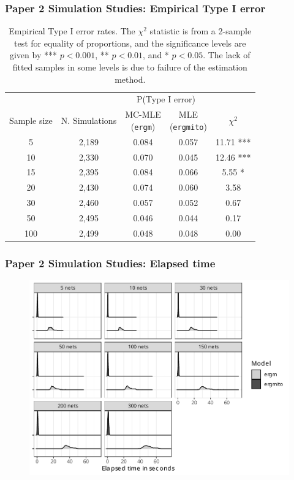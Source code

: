 \documentclass[aspectratio=169, 9pt]{beamer}\usepackage[]{graphicx}\usepackage[]{color}
\newcommand{\ergmpkg}[0]{\texttt{ergm}}
\newcommand{\ergmitopkg}[0]{\texttt{ergmito}}
\begin{document}
\begin{frame}
\frametitle{Paper 2 Simulation Studies: Empirical Type I error}

\footnotesize

\begin{table}[ht]
	\centering
	\begin{tabular}{ccccc}
		\toprule & & \multicolumn{2}{c}{P(Type I error)} \\ \cmidrule(r){3-4}
		Sample size & N. Simulations & \makecell{MC-MLE \\ (\ergmpkg{})} & \makecell{MLE \\ (\ergmitopkg{})} & $\chi^2$ \\ 
		\midrule
		5 & 2,189 & 0.084 & 0.057 & 11.71 *** \\ 
		10 & 2,330 & 0.070 & 0.045 & 12.46 *** \\ 
		15 & 2,395 & 0.084 & 0.066 & 5.55 * \\ 
		20 & 2,430 & 0.074 & 0.060 & 3.58  \\ 
		30 & 2,460 & 0.057 & 0.052 & 0.67  \\ 
		50 & 2,495 & 0.046 & 0.044 & 0.17  \\ 
		100 & 2,499 & 0.048 & 0.048 & 0.00  \\ 
		\bottomrule
	\end{tabular}
	\caption{\label{tab:typeI}Empirical Type I error rates. The $\chi^2$ statistic is from a 2-sample test for equality of proportions, and the significance levels are given by *** $p < 0.001$, ** $p < 0.01$, and * $p < 0.05$. The lack of fitted samples in some levels is due to failure of the estimation method.} 
\end{table}

\end{frame}

\begin{frame}[label=ergmitoexperiment]
\frametitle{Paper 2 Simulation Studies: Elapsed time}

\begin{figure}
\centering
\includegraphics[width=.6\linewidth]{bias-elapsed-02-various-sizes-4-5-ttriad.pdf}
\end{figure}

\vfill\hfill\hyperlink{ergmsims}{}

\end{frame}
\end{document}
